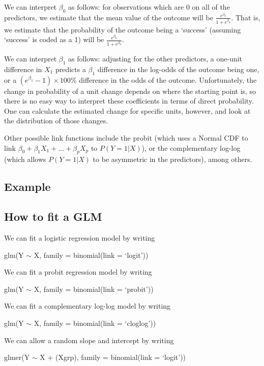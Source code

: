 \documentclass[
  letterpaper,
  DIV=11,
  numbers=noendperiod]{scrreprt}
\begin{document}
We can interpret \(\beta_0\) as follows: for observations which are 0 on
all of the predictors, we estimate that the mean value of the outcome
will be \(\frac{e^{\beta_0}}{1 + e^{\beta_0}}\). That is, we estimate
that the probability of the outcome being a `success' (assuming
`success' is coded as a 1) will be
\(\frac{e^{\beta_0}}{1 + e^{\beta_0}}\).

We can interpret \(\beta_1\) as follows: adjusting for the other
predictors, a one-unit difference in \(X_1\) predicts a \(\beta_1\)
difference in the log-odds of the outcome being one, or a
\((e^{\beta_1}-1)\times100\%\) difference in the odds of the outcome.
Unfortunately, the change in probability of a unit change depends on
where the starting point is, so there is no easy way to interpret these
coefficients in terms of direct probability. One can calculate the
estimated change for specific units, however, and look at the
distribution of those changes.

Other possible link functions include the probit (which uses a Normal
CDF to link \(\beta_0 + \beta_1X_1 + ... + \beta_pX_p\) to
\(P(Y=1|X)\)), or the complementary log-log (which allows \(P(Y = 1|X)\)
to be asymmetric in the predictors), among others.

\hypertarget{example}{%
\subsection{Example}\label{example}}

\hypertarget{how-to-fit-a-glm}{%
\subsection{How to fit a GLM}\label{how-to-fit-a-glm}}

We can fit a logistic regression model by writing

glm(Y \(\sim\) X, family = binomial(link = `logit'))

We can fit a probit regression model by writing

glm(Y \(\sim\) X, family = binomial(link = `probit'))

We can fit a complementary log-log model by writing

glm(Y \(\sim\) X, family = binomial(link = `cloglog'))

We can allow a random slope and intercept by writing

glmer(Y \(\sim\) X + (X\textbar grp), family = binomial(link = `logit'))
\end{document}
